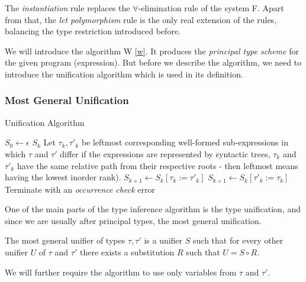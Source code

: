 The \emph{instantiation} rule replaces the $\forall$-elimination rule of the system F. Apart from that, the \emph{let polymorphism} rule is the only real extension of the rules, balancing the type restriction introduced before.

We will introduce the algorithm W \ref{w}. It produces the \emph{principal type scheme} for the given program (expression). But before we describe the algorithm, we need to introduce the unification algorithm which is used in its definition.

\subsubsection{Most General Unification}

\begin{algorithm}[t]
\caption{Unification Algorithm \cite{robinson1965machine}}
\label{mgu}
\begin{algorithmic}[1]
    \State $S_0 \gets \epsilon$
        \Return $S_k$
    \EndIf
    \State Let $\tau_k, \tau'_k$ be leftmost corresponding well-formed sub-expressions in which $\tau$ and $\tau'$ differ \Comment if the expressions are represented by syntactic trees, $\tau_k$ and $\tau'_k$ have the same relative path from their respective roots - then leftmost means having the lowest inorder rank).
        \State $S_{k+1} \gets S_k [\tau_k := \tau'_k]$
        \State $S_{k+1} \gets S_k [\tau'_k := \tau_k]$
    \Else
        \State Terminate with an \textit{occurrence check} error
    \EndIf
    \EndFor
\EndFunction
\end{algorithmic}
\end{algorithm}

One of the main parts of the type inference algorithm is the type unification, and since we are usually after principal types, the most general unification.

\begin{defn}
    The most general unifier of types $\tau, \tau'$ is a unifier $S$ such that for every other unifier $U$ of $\tau$ and $\tau'$ there exists a substitution $R$ such that $U = S \circ R$. \cite{damas1982principal}
\end{defn}

We will further require the algorithm to use only variables from $\tau$ and $\tau'$.

